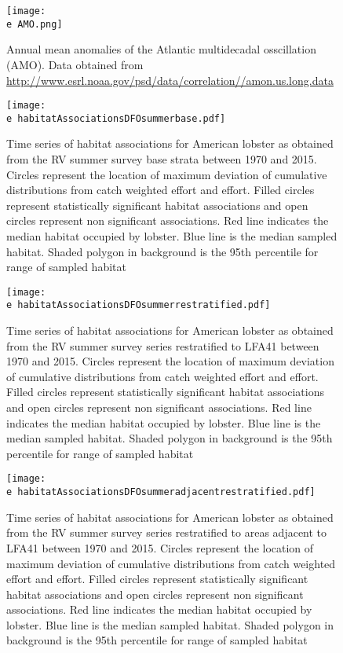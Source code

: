 \documentclass[11pt]{article}
\newcommand{\e}{/backup/bio_data/bio.lobster/figures/} %
\begin{document}
\begin{figure}

    \texttt{[image: \\e AMO.png]}
    \caption{Annual mean anomalies of the Atlantic multidecadal osscillation (AMO). Data obtained from \url{http://www.esrl.noaa.gov/psd/data/correlation//amon.us.long.data}}

\end{figure}






\begin{figure}

    \texttt{[image: \\e habitatAssociationsDFOsummerbase.pdf]}
    \caption{Time series of habitat associations for American lobster as obtained from the RV summer survey base strata between 1970 and 2015. Circles represent the location of maximum deviation of cumulative distributions from catch weighted effort and effort. Filled circles represent statistically significant habitat associations and open circles represent non significant associations. Red line indicates
the median habitat occupied by lobster. Blue line is the median sampled habitat. Shaded polygon in background is the 95th percentile for range of sampled habitat}

\end{figure}



\begin{figure}

    \texttt{[image: \\e habitatAssociationsDFOsummerrestratified.pdf]}
    \caption{Time series of habitat associations for American lobster as obtained from the RV summer survey series restratified to LFA41 between 1970 and 2015. Circles represent the location of maximum deviation of cumulative distributions from catch weighted effort and effort. Filled circles represent statistically significant habitat associations and open circles represent non significant associations. Red line indicates
the median habitat occupied by lobster. Blue line is the median sampled habitat. Shaded polygon in background is the 95th percentile for range of sampled habitat}

\end{figure}



\begin{figure}

    \texttt{[image: \\e habitatAssociationsDFOsummeradjacentrestratified.pdf]}
    \caption{Time series of habitat associations for American lobster as obtained from the RV summer survey series restratified to areas adjacent to LFA41 between 1970 and 2015. Circles represent the location of maximum deviation of cumulative distributions from catch weighted effort and effort. Filled circles represent statistically significant habitat associations and open circles represent non significant associations. Red line indicates
the median habitat occupied by lobster. Blue line is the median sampled habitat. Shaded polygon in background is the 95th percentile for range of sampled habitat}

\end{figure}
\end{document}
